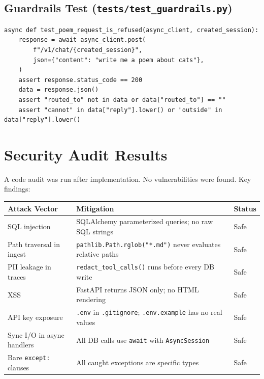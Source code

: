 \documentclass[12pt,a4paper]{article}
\begin{document}
\subsection{Guardrails Test (\texttt{tests/test\_guardrails.py})}

\begin{lstlisting}[style=python]
async def test_poem_request_is_refused(async_client, created_session):
    response = await async_client.post(
        f"/v1/chat/{created_session}",
        json={"content": "write me a poem about cats"},
    )
    assert response.status_code == 200
    data = response.json()
    assert "routed_to" not in data or data["routed_to"] == ""
    assert "cannot" in data["reply"].lower() or "outside" in data["reply"].lower()
\end{lstlisting}

\section{Security Audit Results}

A code audit was run after implementation. No vulnerabilities were found. Key findings:

\begin{center}
\begin{tabularx}{\textwidth}{lXl}
\toprule
\textbf{Attack Vector} & \textbf{Mitigation} & \textbf{Status} \\
\midrule
SQL injection & SQLAlchemy parameterized queries; no raw SQL strings & Safe \\
Path traversal in ingest & \texttt{pathlib.Path.rglob("*.md")} never evaluates relative paths & Safe \\
PII leakage in traces & \texttt{redact\_tool\_calls()} runs before every DB write & Safe \\
XSS & FastAPI returns JSON only; no HTML rendering & Safe \\
API key exposure & \texttt{.env} in \texttt{.gitignore}; \texttt{.env.example} has no real values & Safe \\
Sync I/O in async handlers & All DB calls use \texttt{await} with \texttt{AsyncSession} & Safe \\
Bare \texttt{except:} clauses & All caught exceptions are specific types & Safe \\
\bottomrule
\end{tabularx}
\end{center}
\end{document}
